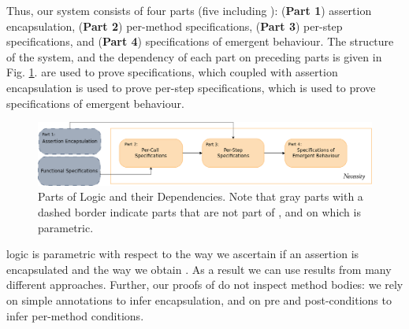 {{  Thus, our system consists of four parts (five including \funcSpecs):
(\textbf{Part 1}) assertion encapsulation, (\textbf{Part 2}) {per-method} specifications, 
(\textbf{Part 3}) per-step specifications, and (\textbf{Part 4}) specifications of emergent behaviour.
The structure of the system, and the dependency of each part on preceding parts is given in Fig. \ref{fig:dependency}.
 \FuncSpecs are used to prove  specifications, which coupled with 
assertion encapsulation is used to prove per-step specifications, which is used to 
prove specifications of emergent behaviour.
\begin{figure}[t]
\includegraphics[width=\textwidth]{diagrams/dependency.png}
   \caption{
   Parts of \Nec Logic {and their Dependencies}. 
   Note that gray parts with a dashed border indicate
   parts that are not part of \Nec, and on which \Nec 
   is parametric.}

   \label{fig:dependency}
 \end{figure}

\Nec logic  is parametric with respect to  {the way we ascertain if an assertion
is encapsulated and the way we obtain \funcSpecs.}
As a result we can use results from many different approaches.
Further, our proofs of \Nec do not inspect method
bodies: we rely on simple annotations to infer encapsulation, and
{on} pre and post-conditions  to infer per-method conditions. 



 


}}
